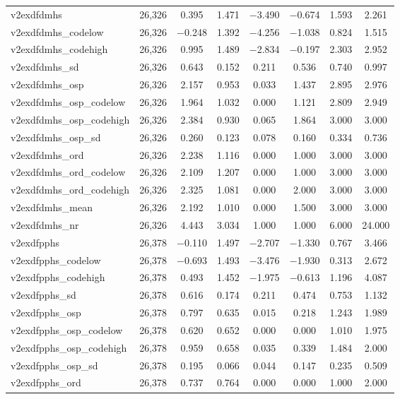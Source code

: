 \begin{table}[!htbp]
\begin{tabular}{@{\extracolsep{5pt}}lccccccc}
v2exdfdmhs & 26,326 & 0.395 & 1.471 & $-$3.490 & $-$0.674 & 1.593 & 2.261 \\ 
v2exdfdmhs\_codelow & 26,326 & $-$0.248 & 1.392 & $-$4.256 & $-$1.038 & 0.824 & 1.515 \\ 
v2exdfdmhs\_codehigh & 26,326 & 0.995 & 1.489 & $-$2.834 & $-$0.197 & 2.303 & 2.952 \\ 
v2exdfdmhs\_sd & 26,326 & 0.643 & 0.152 & 0.211 & 0.536 & 0.740 & 0.997 \\ 
v2exdfdmhs\_osp & 26,326 & 2.157 & 0.953 & 0.033 & 1.437 & 2.895 & 2.976 \\ 
v2exdfdmhs\_osp\_codelow & 26,326 & 1.964 & 1.032 & 0.000 & 1.121 & 2.809 & 2.949 \\ 
v2exdfdmhs\_osp\_codehigh & 26,326 & 2.384 & 0.930 & 0.065 & 1.864 & 3.000 & 3.000 \\ 
v2exdfdmhs\_osp\_sd & 26,326 & 0.260 & 0.123 & 0.078 & 0.160 & 0.334 & 0.736 \\ 
v2exdfdmhs\_ord & 26,326 & 2.238 & 1.116 & 0.000 & 1.000 & 3.000 & 3.000 \\ 
v2exdfdmhs\_ord\_codelow & 26,326 & 2.109 & 1.207 & 0.000 & 1.000 & 3.000 & 3.000 \\ 
v2exdfdmhs\_ord\_codehigh & 26,326 & 2.325 & 1.081 & 0.000 & 2.000 & 3.000 & 3.000 \\ 
v2exdfdmhs\_mean & 26,326 & 2.192 & 1.010 & 0.000 & 1.500 & 3.000 & 3.000 \\ 
v2exdfdmhs\_nr & 26,326 & 4.443 & 3.034 & 1.000 & 1.000 & 6.000 & 24.000 \\ 
v2exdfpphs & 26,378 & $-$0.110 & 1.497 & $-$2.707 & $-$1.330 & 0.767 & 3.466 \\ 
v2exdfpphs\_codelow & 26,378 & $-$0.693 & 1.493 & $-$3.476 & $-$1.930 & 0.313 & 2.672 \\ 
v2exdfpphs\_codehigh & 26,378 & 0.493 & 1.452 & $-$1.975 & $-$0.613 & 1.196 & 4.087 \\ 
v2exdfpphs\_sd & 26,378 & 0.616 & 0.174 & 0.211 & 0.474 & 0.753 & 1.132 \\ 
v2exdfpphs\_osp & 26,378 & 0.797 & 0.635 & 0.015 & 0.218 & 1.243 & 1.989 \\ 
v2exdfpphs\_osp\_codelow & 26,378 & 0.620 & 0.652 & 0.000 & 0.000 & 1.010 & 1.975 \\ 
v2exdfpphs\_osp\_codehigh & 26,378 & 0.959 & 0.658 & 0.035 & 0.339 & 1.484 & 2.000 \\ 
v2exdfpphs\_osp\_sd & 26,378 & 0.195 & 0.066 & 0.044 & 0.147 & 0.235 & 0.509 \\ 
v2exdfpphs\_ord & 26,378 & 0.737 & 0.764 & 0.000 & 0.000 & 1.000 & 2.000 \\ 

\end{tabular}
\end{table}
